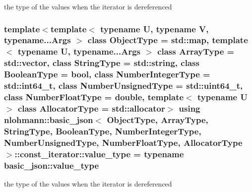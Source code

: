 the type of the values when the iterator is dereferenced 

\hypertarget{classnlohmann_1_1basic__json_1_1const__iterator_a9ea0497199b1e96ce9cadd1f202ec343}{
\subsubsection[{value\-\_\-type}]{\setlength{\rightskip}{0pt plus 5cm}template$<$template$<$ typename U, typename V, typename...\-Args $>$ class Object\-Type = std\-::map, template$<$ typename U, typename...\-Args $>$ class Array\-Type = std\-::vector, class String\-Type  = std\-::string, class Boolean\-Type  = bool, class Number\-Integer\-Type  = std\-::int64\-\_\-t, class Number\-Unsigned\-Type  = std\-::uint64\-\_\-t, class Number\-Float\-Type  = double, template$<$ typename U $>$ class Allocator\-Type = std\-::allocator$>$ using {\bf nlohmann\-::basic\-\_\-json}$<$ Object\-Type, Array\-Type, String\-Type, Boolean\-Type, Number\-Integer\-Type, Number\-Unsigned\-Type, Number\-Float\-Type, Allocator\-Type $>$\-::{\bf const\-\_\-iterator\-::value\-\_\-type} =  typename {\bf basic\-\_\-json\-::value\-\_\-type}}}\label{classnlohmann_1_1basic__json_1_1const__iterator_a9ea0497199b1e96ce9cadd1f202ec343}


the type of the values when the iterator is dereferenced 



